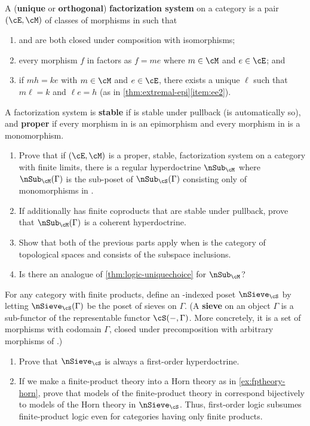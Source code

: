 \begin{ex}\label{ex:factsys}
  A (\textbf{unique} or \textbf{orthogonal}) \textbf{factorization system} on a category \cS is a pair $(\cE,\cM)$ of classes of morphisms in \cS such that
  \begin{enumerate}
  \item \cE and \cM are both closed under composition with isomorphisms;
  \item every morphism $f$ in \cS factors as $f=m e$ where $m\in\cM$ and $e\in\cE$; and
  \item if $m h = k e$ with $m\in\cM$ and $e\in \cE$, there exists a unique $\ell$ such that $m\ell=k$ and $\ell e = h$ (as in \cref{thm:extremal-epi}\ref{item:ee2}).
  \end{enumerate}
  A factorization system is \textbf{stable} if \cE is stable under pullback (\cM is automatically so), and \textbf{proper} if every morphism in \cE is an epimorphism and every morphism in \cM is a monomorphism.
  \begin{enumerate}
  \item Prove that if $(\cE,\cM)$ is a proper, stable, factorization system on a category \cS with finite limits, there is a regular hyperdoctrine $\sub_\cM$ where $\sub_\cM(\Gamma)$ is the sub-poset of $\sub_\cS(\Gamma)$ consisting only of monomorphisms in \cM.
  \item If \cS additionally has finite coproducts that are stable under pullback, prove that $\sub_\cM(\Gamma)$ is a coherent hyperdoctrine.
  \item Show that both of the previous parts apply when \cS is the category of topological spaces and \cM consists of the subspace inclusions.
  \item Is there an analogue of \cref{thm:logic-uniquechoice} for $\sub_\cM$?
  \end{enumerate}
\end{ex}

\begin{ex}\label{ex:sieves}
  For any category \cS with finite products, define an \cS-indexed poset $\sieve_\cS$ by letting $\sieve_\cS(\Gamma)$ be the poset of sieves on $\Gamma$.
  (A \textbf{sieve} on an object $\Gamma$ is a sub-functor of the representable functor $\cS(-,\Gamma)$.
  More concretely, it is a set of morphisms with codomain $\Gamma$, closed under precomposition with arbitrary morphisms of \cS.)
  \begin{enumerate}
  \item Prove that $\sieve_\cS$ is always a first-order hyperdoctrine.
  \item If we make a finite-product theory into a Horn theory as in \cref{ex:fptheory-horn}, prove that models of the finite-product theory in \cS correspond bijectively to models of the Horn theory in $\sieve_\cS$.
    Thus, first-order logic subsumes finite-product logic even for categories having only finite products.
  \end{enumerate}
\end{ex}

